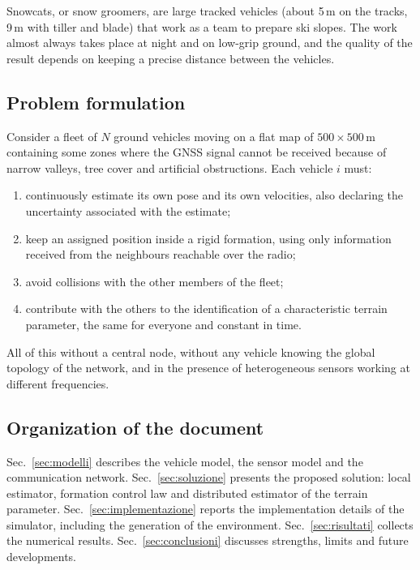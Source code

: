 \documentclass[conference,9pt]{IEEEtran}
\begin{document}
Snowcats, or snow groomers, are large tracked vehicles (about 5\,m on the
tracks, 9\,m with tiller and blade) that work as a team to prepare ski slopes.
The work almost always takes place at night and on low-grip ground, and the
quality of the result depends on keeping a precise distance between the
vehicles.

\subsection{Problem formulation}

Consider a fleet of $N$ ground vehicles moving on a flat map of
$500 \times 500$\,m containing some zones where the GNSS signal cannot be
received because of narrow valleys, tree cover and artificial obstructions.
Each vehicle $i$ must:

\begin{enumerate}
\item continuously estimate its own pose and its own velocities, also declaring
      the uncertainty associated with the estimate;
\item keep an assigned position inside a rigid formation, using only
      information received from the neighbours reachable over the radio;
\item avoid collisions with the other members of the fleet;
\item contribute with the others to the identification of a characteristic
      terrain parameter, the same for everyone and constant in time.
\end{enumerate}

All of this without a central node, without any vehicle knowing the global
topology of the network, and in the presence of heterogeneous sensors working
at different frequencies.

\subsection{Organization of the document}

Sec.~\ref{sec:modelli} describes the vehicle model, the sensor model and the
communication network. Sec.~\ref{sec:soluzione} presents the proposed solution:
local estimator, formation control law and distributed estimator of the terrain
parameter. Sec.~\ref{sec:implementazione} reports the implementation details of
the simulator, including the generation of the environment.
Sec.~\ref{sec:risultati} collects the numerical results.
Sec.~\ref{sec:conclusioni} discusses strengths, limits and future developments.
\end{document}
